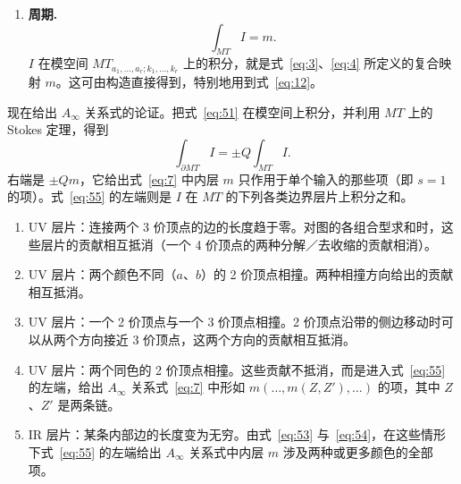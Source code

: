 \begin{enumerate}

  \item[(iii)] \textbf{周期.}\quad
  \begin{equation}\tag{54}\label{eq:54}
    \int_{MT}I=m.
  \end{equation}
  $I$ 在模空间 $MT_{a_1,\dots,a_r;k_1,\dots,k_r}$ 上的积分，就是式~\eqref{eq:3}、\eqref{eq:4} 所定义的复合映射 $m$。这可由构造直接得到，特别地用到式~\eqref{eq:12}。
\end{enumerate}

现在给出 $A_\infty$ 关系式的论证。把式~\eqref{eq:51} 在模空间上积分，并利用 $MT$ 上的 Stokes 定理，得到
\begin{equation}\tag{55}\label{eq:55}
  \int_{\partial MT}I=\pm Q\int_{MT}I.
\end{equation}
右端是 $\pm Qm$，它给出式~\eqref{eq:7} 中内层 $m$ 只作用于单个输入的那些项（即 $s=1$ 的项）。式~\eqref{eq:55} 的左端则是 $I$ 在 $MT$ 的下列各类边界层片上积分之和。


\begin{enumerate}
  \item[(a)] UV 层片：连接两个 3 价顶点的边的长度趋于零。对图的各组合型求和时，这些层片的贡献相互抵消（一个 4 价顶点的两种分解／去收缩的贡献相消）。
  \item[(b)] UV 层片：两个颜色不同（$a$、$b$）的 2 价顶点相撞。两种相撞方向给出的贡献相互抵消。
  \item[(c)] UV 层片：一个 2 价顶点与一个 3 价顶点相撞。2 价顶点沿带的侧边移动时可以从两个方向接近 3 价顶点，这两个方向的贡献相互抵消。
  \item[(d)] UV 层片：两个同色的 2 价顶点相撞。这些贡献不抵消，而是进入式~\eqref{eq:55} 的左端，给出 $A_\infty$ 关系式~\eqref{eq:7} 中形如 $m(\dots,m(Z,Z'),\dots)$ 的项，其中 $Z$、$Z'$ 是两条链。
  \item[(e)] IR 层片：某条内部边的长度变为无穷。由式~\eqref{eq:53} 与~\eqref{eq:54}，在这些情形下式~\eqref{eq:55} 的左端给出 $A_\infty$ 关系式中内层 $m$ 涉及两种或更多颜色的全部项。
\end{enumerate}

